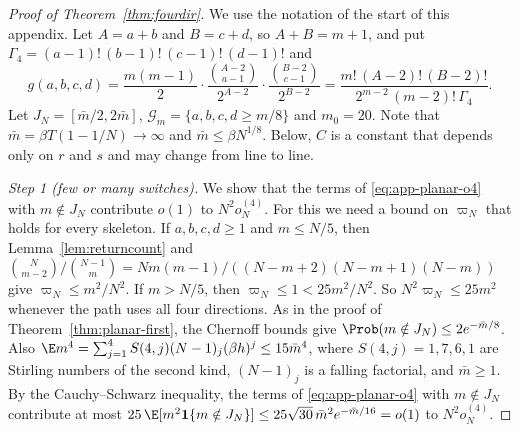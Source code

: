 \begin{proof}[Proof of Theorem~\ref{thm:fourdir}]
We use the notation of the start of this appendix. Let $A=a+b$ and $B=c+d$, so $A+B=m+1$, and put $\Gamma_4=(a-1)!\,(b-1)!\,(c-1)!\,(d-1)!$ and
\[
 g(a,b,c,d)=\frac{m(m-1)}2\cdot\frac{\binom{A-2}{a-1}}{2^{A-2}}\cdot\frac{\binom{B-2}{c-1}}{2^{B-2}}
 =\frac{m!\,(A-2)!\,(B-2)!}{2^{m-2}\,(m-2)!\,\Gamma_4}.
\]
Let $J_N=[\bar m/2,2\bar m]$, $\mathcal G_m=\{a,b,c,d\ge m/8\}$ and $m_0=20$. Note that
$\bar m=\beta T(1-1/N)\to\infty$ and $\bar m\le\beta N^{1/8}$. Below, $C$ is a constant that depends
only on $r$ and $s$ and may change from line to line.

\emph{Step 1 (few or many switches).} We show that the terms of \eqref{eq:app-planar-o4} with
$m\notin J_N$ contribute $o(1)$ to $N^2o^{(4)}_N$. For this we need a bound on $\varpi_N$ that holds
for every skeleton. If $a,b,c,d\ge1$ and $m\le N/5$, then
Lemma~\ref{lem:returncount} and
$\binom N{m-2}/\binom{N-1}m=Nm(m-1)/((N-m+2)(N-m+1)(N-m))$ give $\varpi_N\le m^2/N^2$. If $m>N/5$,
then $\varpi_N\le1<25m^2/N^2$. So $N^2\varpi_N\le25m^2$ whenever the path uses all four directions.
As in the proof of Theorem~\ref{thm:planar-first}, the Chernoff bounds give
$\Prob(m\notin J_N)\le2e^{-\bar m/8}$. Also
$\E m^4=\sum_{j=1}^4S(4,j)(N-1)_j(\beta h)^j\le15\bar m^4$, where $S(4,j)=1,7,6,1$ are Stirling
numbers of the second kind, $(N-1)_j$ is a falling factorial, and $\bar m\ge1$. By the
Cauchy--Schwarz inequality, the terms of \eqref{eq:app-planar-o4} with $m\notin J_N$ contribute at
most $25\,\E[m^2\mathbf 1\{m\notin J_N\}]\le25\sqrt{30}\,\bar m^2e^{-\bar m/16}=o(1)$ to
$N^2o^{(4)}_N$.


\end{proof}
